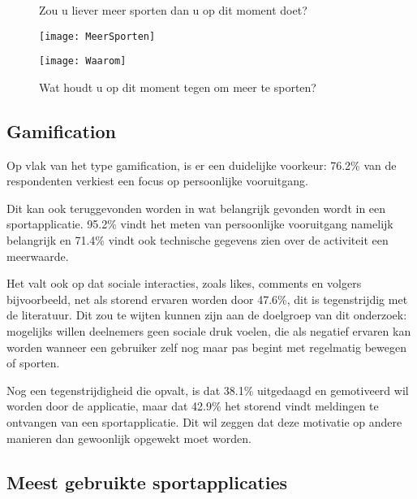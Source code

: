 \begin{figure}[htbp]
    \begin{minipage}[t]{0.48\linewidth} %
        \centering
        \caption[Zou u liever meer sporten dan u op dit moment doet?]{Zou u liever meer sporten dan u op dit moment doet?}
        \texttt{[image: MeerSporten]}
        \label{fig:meerBewegen}
    \end{minipage}
    \hfill
    \begin{minipage}[t]{0.48\linewidth} %
        \centering
        \caption[Wat houdt u op dit moment tegen om meer te sporten?]{Wat houdt u op dit moment tegen om meer te sporten?}
        \texttt{[image: Waarom]}
        \label{fig:waarom}
    \end{minipage}
\end{figure}

\subsection{Gamification}

Op vlak van het type gamification, is er een duidelijke voorkeur: 76.2\% van de respondenten verkiest een focus op persoonlijke vooruitgang.

Dit kan ook teruggevonden worden in wat belangrijk gevonden wordt in een sportapplicatie. 95.2\% vindt het meten van persoonlijke vooruitgang namelijk belangrijk en 71.4\% vindt ook technische gegevens zien over de activiteit een meerwaarde.

Het valt ook op dat sociale interacties, zoals likes, comments en volgers bijvoorbeeld, net als storend ervaren worden door 47.6\%, dit is tegenstrijdig met de literatuur. Dit zou te wijten kunnen zijn aan de doelgroep van dit onderzoek: mogelijks willen deelnemers geen sociale druk voelen, die als negatief ervaren kan worden wanneer een gebruiker zelf nog maar pas begint met regelmatig bewegen of sporten.

Nog een tegenstrijdigheid die opvalt, is dat 38.1\% uitgedaagd en gemotiveerd wil worden door de applicatie, maar dat 42.9\% het storend vindt meldingen te ontvangen van een sportapplicatie. Dit wil zeggen dat deze motivatie op andere manieren dan gewoonlijk opgewekt moet worden.

\subsection{Meest gebruikte sportapplicaties}

